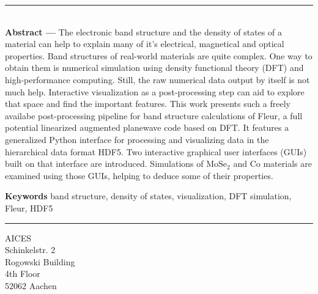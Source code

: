 \clearpage


\thispagestyle{empty}

\vspace*{\fill}
\noindent\rule[2pt]{\textwidth}{0.5pt}\\
{\textbf{Abstract ---}}
The electronic band structure and the density of states of a material can help
to explain many of it's electrical, magnetical and optical properties. Band
structures of real-world materials are quite complex. One way to obtain them is
numerical simulation using density functional theory (DFT) and high-performance
computing. Still, the raw numerical data output by itself is not much help.
Interactive visualization as a post-processing step can aid to explore that
space and find the important features. This work presents such a freely availabe
post-processing pipeline for band structure calculations of Fleur, a full
potential linearized augmented planewave code based on DFT. It features a
generalized Python interface for processing and visualizing data in the
hierarchical data format HDF5. Two interactive graphical user interfaces (GUIs)
built on that interface are introduced. Simulations of $\textrm{MoSe}_2$ and
$\textrm{Co}$ materials are examined using those GUIs, helping to deduce
some of their properties.


{\textbf{Keywords}}
band structure, density of states, visualization, DFT simulation, Fleur, HDF5
\\


\noindent\rule[2pt]{\textwidth}{0.5pt}
\begin{center}
    AICES\\
    Schinkelstr. 2\\
    Rogowski Building\\
    4th Floor\\
    52062 Aachen    
\end{center}
\vspace*{\fill}

